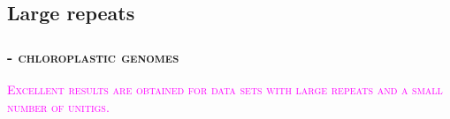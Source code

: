 \documentclass{beamer}
\begin{document}
\subsection{Large repeats}\label{largerepeats}
\begin{frame}
\frametitle{\textsc{ - chloroplastic genomes}}
\begin{center}
\footnotesize \textsc{\textcolor{magenta}{Excellent results are obtained for data sets with large repeats and a small number of unitigs.}} \\
\vspace*{0.2cm}
\end{center}
\end{frame}
\end{document}
